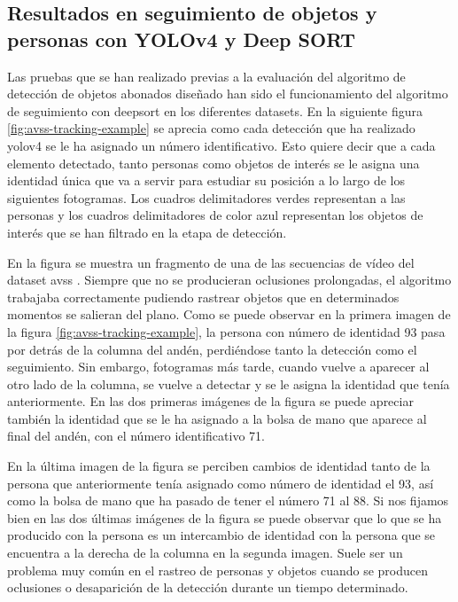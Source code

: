 \subsection{Resultados en seguimiento de objetos y personas con YOLOv4 y Deep SORT}
\label{subsec:resultados-yolov4+deepsort}

Las pruebas que se han realizado previas a la evaluación del algoritmo de detección de objetos abonados diseñado han sido el funcionamiento del algoritmo de seguimiento con \gls{deepsort} en los diferentes datasets. En la siguiente figura \ref{fig:avss-tracking-example} se aprecia como cada detección que ha realizado \gls{yolov4} se le ha asignado un número identificativo. Esto quiere decir que a cada elemento detectado, tanto personas como objetos de interés se le asigna una identidad única que va a servir para estudiar su posición a lo largo de los siguientes fotogramas. Los cuadros delimitadores verdes representan a las personas y los cuadros delimitadores de color azul representan los objetos de interés que se han filtrado en la etapa de detección.

En la figura se muestra un fragmento de una de las secuencias de vídeo del dataset \gls{avss} \cite{AVSSAB2007-dataset}. Siempre que no se producieran oclusiones prolongadas, el algoritmo trabajaba correctamente pudiendo rastrear objetos que en determinados momentos se salieran del plano. Como se puede observar en la primera imagen de la figura \ref{fig:avss-tracking-example}, la persona con número de identidad 93 pasa por detrás de la columna del andén, perdiéndose tanto la detección como el seguimiento. Sin embargo, fotogramas más tarde, cuando vuelve a aparecer al otro lado de la columna, se vuelve a detectar y se le asigna la identidad que tenía anteriormente. En las dos primeras imágenes de la figura se puede apreciar también la identidad que se le ha asignado a la bolsa de mano que aparece al final del andén, con el número identificativo 71.

En la última imagen de la figura se perciben cambios de identidad tanto de la persona que anteriormente tenía asignado como número de identidad el 93, así como la bolsa de mano que ha pasado de tener el número 71 al 88. Si nos fijamos bien en las dos últimas imágenes de la figura se puede observar que lo que se ha producido con la persona es un intercambio de identidad con la persona que se encuentra a la derecha de la columna en la segunda imagen. Suele ser un problema muy común en el rastreo de personas y objetos cuando se producen oclusiones o desaparición de la detección durante un tiempo determinado.

